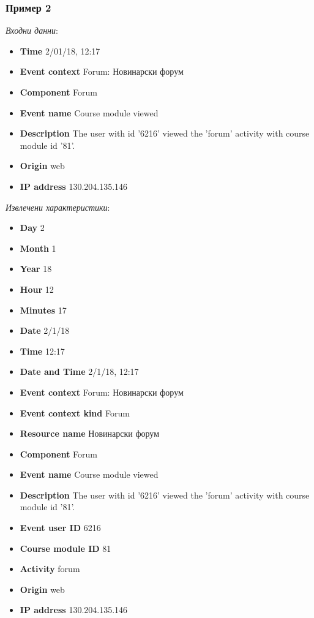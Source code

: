 \documentclass[a4paper, 12pt]{article}
\begin{document}
\subsubsection{Пример 2}		
\textit{Входни данни}:		
\begin{itemize}
\item \textbf{Time} 2/01/18, 12:17
\item \textbf{Event context} Forum: Новинарски форум
\item \textbf{Component} Forum
\item \textbf{Event name} Course module viewed
\item \textbf{Description} The user with id '6216' viewed the 'forum' activity with course module id '81'.
\item \textbf{Origin} web
\item \textbf{IP address} 130.204.135.146
\end{itemize}

\textit{Извлечени характеристики}:
\begin{itemize}
\item \textbf{Day} 2
\item \textbf{Month} 1
\item \textbf{Year} 18
\item \textbf{Hour} 12
\item \textbf{Minutes} 17
\item \textbf{Date} 2/1/18
\item \textbf{Time} 12:17
\item \textbf{Date and Time} 2/1/18, 12:17
\item \textbf{Event context} Forum: Новинарски форум
\item \textbf{Event context kind} Forum
\item \textbf{Resource name} Новинарски форум
\item \textbf{Component} Forum
\item \textbf{Event name} Course module viewed
\item \textbf{Description} The user with id '6216' viewed the 'forum' activity with course module id '81'.
\item \textbf{Event user ID} 6216
\item \textbf{Course module ID} 81
\item \textbf{Activity} forum
\item \textbf{Origin} web 
\item \textbf{IP address} 130.204.135.146
\end{itemize}
\end{document}
